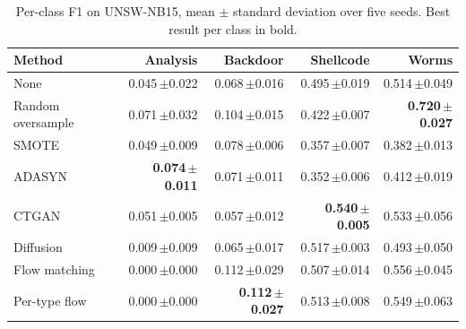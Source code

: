 \begin{table}[t]
\centering
\caption{Per-class F1 on UNSW-NB15, mean $\pm$ standard deviation over five seeds. Best result per class in bold.}
\label{tab:full_unsw}
\begin{tabular}{lrrrr}
\toprule
Method & Analysis & Backdoor & Shellcode & Worms \\
\midrule
None & 0.045\,\tiny{$\pm$0.022} & 0.068\,\tiny{$\pm$0.016} & 0.495\,\tiny{$\pm$0.019} & 0.514\,\tiny{$\pm$0.049} \\
Random oversample & 0.071\,\tiny{$\pm$0.032} & 0.104\,\tiny{$\pm$0.015} & 0.422\,\tiny{$\pm$0.007} & \textbf{0.720\,\tiny{$\pm$0.027}} \\
SMOTE & 0.049\,\tiny{$\pm$0.009} & 0.078\,\tiny{$\pm$0.006} & 0.357\,\tiny{$\pm$0.007} & 0.382\,\tiny{$\pm$0.013} \\
ADASYN & \textbf{0.074\,\tiny{$\pm$0.011}} & 0.071\,\tiny{$\pm$0.011} & 0.352\,\tiny{$\pm$0.006} & 0.412\,\tiny{$\pm$0.019} \\
\midrule
CTGAN & 0.051\,\tiny{$\pm$0.005} & 0.057\,\tiny{$\pm$0.012} & \textbf{0.540\,\tiny{$\pm$0.005}} & 0.533\,\tiny{$\pm$0.056} \\
Diffusion & 0.009\,\tiny{$\pm$0.009} & 0.065\,\tiny{$\pm$0.017} & 0.517\,\tiny{$\pm$0.003} & 0.493\,\tiny{$\pm$0.050} \\
Flow matching & 0.000\,\tiny{$\pm$0.000} & 0.112\,\tiny{$\pm$0.029} & 0.507\,\tiny{$\pm$0.014} & 0.556\,\tiny{$\pm$0.045} \\
Per-type flow & 0.000\,\tiny{$\pm$0.000} & \textbf{0.112\,\tiny{$\pm$0.027}} & 0.513\,\tiny{$\pm$0.008} & 0.549\,\tiny{$\pm$0.063} \\
\bottomrule
\end{tabular}
\end{table}
